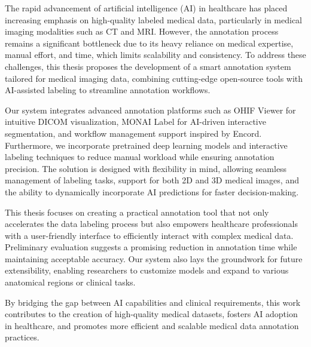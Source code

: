 \begin{EnAbstract}
The rapid advancement of artificial intelligence (AI) in healthcare has placed increasing emphasis on high-quality labeled medical data, particularly in medical imaging modalities such as CT and MRI. However, the annotation process remains a significant bottleneck due to its heavy reliance on medical expertise, manual effort, and time, which limits scalability and consistency. To address these challenges, this thesis proposes the development of a smart annotation system tailored for medical imaging data, combining cutting-edge open-source tools with AI-assisted labeling to streamline annotation workflows.

Our system integrates advanced annotation platforms such as OHIF Viewer for intuitive DICOM visualization, MONAI Label for AI-driven interactive segmentation, and workflow management support inspired by Encord. Furthermore, we incorporate pretrained deep learning models and interactive labeling techniques to reduce manual workload while ensuring annotation precision. The solution is designed with flexibility in mind, allowing seamless management of labeling tasks, support for both 2D and 3D medical images, and the ability to dynamically incorporate AI predictions for faster decision-making.

This thesis focuses on creating a practical annotation tool that not only accelerates the data labeling process but also empowers healthcare professionals with a user-friendly interface to efficiently interact with complex medical data. Preliminary evaluation suggests a promising reduction in annotation time while maintaining acceptable accuracy. Our system also lays the groundwork for future extensibility, enabling researchers to customize models and expand to various anatomical regions or clinical tasks.

By bridging the gap between AI capabilities and clinical requirements, this work contributes to the creation of high-quality medical datasets, fosters AI adoption in healthcare, and promotes more efficient and scalable medical data annotation practices.


\end{EnAbstract}